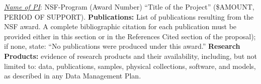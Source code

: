 \noindent
\emph{\underline{Name of PI}}: NSF-Program (Award Number) ``Title of the Project'' (\$AMOUNT, PERIOD OF SUPPORT).
{\bf Publications:} List of publications resulting from the NSF award. A complete bibliographic citation for each
publication must be provided either in this section or in the References Cited section of the proposal); if
none, state: ``No publications were produced under this award.'' {\bf Research Products:} evidence of research products
and their availability, including, but not limited to: data, publications, samples, physical collections, software,
and models, as described in any Data Management Plan.
